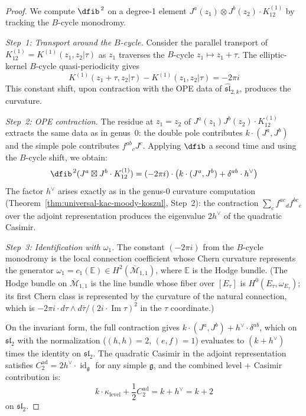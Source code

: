 \begin{proof}
We compute $\dfib^{\,2}$ on a degree-1 element $J^a(z_1) \otimes J^b(z_2) \cdot K^{(1)}_{12}$ by tracking the $B$-cycle monodromy.

\emph{Step~1: Transport around the $B$-cycle.}
Consider the parallel transport of $K^{(1)}_{12} = K^{(1)}(z_1,z_2|\tau)$ as $z_1$ traverses the $B$-cycle $z_1 \mapsto z_1 + \tau$. The elliptic-kernel $B$-cycle quasi-periodicity gives
\begin{equation}
K^{(1)}(z_1+\tau,z_2|\tau) - K^{(1)}(z_1,z_2|\tau) = -2\pi i
\end{equation}
This constant shift, upon contraction with the OPE data of $\widehat{\mathfrak{sl}}_{2,k}$, produces the curvature.

\emph{Step~2: OPE contraction.}
The residue at $z_1 = z_2$ of $J^a(z_1) J^b(z_2) \cdot K^{(1)}_{12}$ extracts the same data as in genus~0: the double pole contributes $k \cdot (J^a, J^b)$ and the simple pole contributes $f^{ab}{}_c J^c$. Applying $\dfib$ a second time and using the $B$-cycle shift, we obtain:
\begin{equation}
\dfib^{\,2}(J^a \boxtimes J^b \cdot K^{(1)}_{12}) = (-2\pi i) \cdot \bigl(k \cdot (J^a, J^b) + \delta^{ab} \cdot h^\vee\bigr)
\end{equation}
The factor $h^\vee$ arises exactly as in the genus-0 curvature computation (Theorem~\ref{thm:universal-kac-moody-koszul}, Step~2): the contraction $\sum_c f^{ac}{}_d f^{bc}{}_e$ over the adjoint representation produces the eigenvalue $2h^\vee$ of the quadratic Casimir.

\emph{Step~3: Identification with $\omega_1$.}
The constant $(-2\pi i)$ from the $B$-cycle monodromy is the local connection coefficient whose Chern curvature represents the generator $\omega_1 = c_1(\mathbb{E}) \in H^2(\overline{\mathcal{M}}_{1,1})$, where $\mathbb{E}$ is the Hodge bundle. (The Hodge bundle on $\overline{\mathcal{M}}_{1,1}$ is the line bundle whose fiber over $[E_\tau]$ is $H^0(E_\tau, \omega_{E_\tau})$; its first Chern class is represented by the curvature of the natural connection, which is $-2\pi i \cdot d\tau \wedge d\bar{\tau}/(2i \cdot \operatorname{Im}\tau)^2$ in the $\tau$ coordinate.)

On the invariant form, the full contraction gives
$k \cdot (J^a, J^b) + h^\vee \cdot \delta^{ab}$, which on
$\mathfrak{sl}_2$ with the normalization ($(h,h) = 2$, $(e,f)=1$)
evaluates to $(k+h^\vee)$ times the identity on $\mathfrak{sl}_2$.
The quadratic Casimir in the adjoint representation satisfies
$C_2^{\mathrm{ad}} = 2h^\vee \cdot \operatorname{id}_{\mathfrak{g}}$
for any simple $\mathfrak{g}$, and the combined level + Casimir
contribution is:
\begin{equation}
k \cdot \kappa_{\mathrm{level}} + \frac{1}{2}C_2^{\mathrm{ad}} = k + h^\vee = k + 2
\end{equation}
on $\mathfrak{sl}_2$.


\end{proof}
